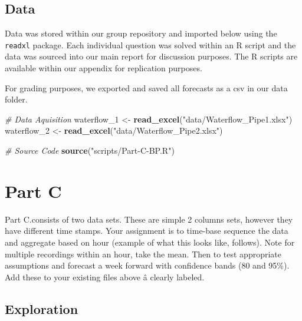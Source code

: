\documentclass[openany]{book}
\newenvironment{Shaded}{\begin{snugshade}}{\end{snugshade}}
\newcommand{\CommentTok}[1]{\textcolor[rgb]{0.56,0.35,0.01}{\textit{#1}}}
\newcommand{\DecValTok}[1]{\textcolor[rgb]{0.00,0.00,0.81}{#1}}
\newcommand{\KeywordTok}[1]{\textcolor[rgb]{0.13,0.29,0.53}{\textbf{#1}}}
\newcommand{\NormalTok}[1]{#1}
\newcommand{\StringTok}[1]{\textcolor[rgb]{0.31,0.60,0.02}{#1}}
\renewenvironment{quote}{\begin{myquote}}{\end{myquote}}
\begin{document}
\newpage

\hypertarget{data}{%
\section*{Data}\label{data}}

Data was stored within our group repository and imported below using the
\texttt{readxl} package. Each individual question was solved within an R
script and the data was sourced into our main report for discussion
purposes. The R scripts are available within our appendix for
replication purposes.

For grading purposes, we exported and saved all forecasts as a csv in
our data folder.

\begin{Shaded}
\begin{Highlighting}[]
\CommentTok{# Data Aquisition}
\NormalTok{waterflow_}\DecValTok{1}\NormalTok{ <-}\StringTok{ }\KeywordTok{read_excel}\NormalTok{(}\StringTok{"data/Waterflow_Pipe1.xlsx"}\NormalTok{)}
\NormalTok{waterflow_}\DecValTok{2}\NormalTok{ <-}\StringTok{ }\KeywordTok{read_excel}\NormalTok{(}\StringTok{"data/Waterflow_Pipe2.xlsx"}\NormalTok{)}

\CommentTok{# Source Code}
\KeywordTok{source}\NormalTok{(}\StringTok{"scripts/Part-C-BP.R"}\NormalTok{)}
\end{Highlighting}
\end{Shaded}

\hypertarget{part-c}{%
\chapter{Part C}\label{part-c}}

\begin{quote}
Part C.consists of two data sets. These are simple 2 columns sets,
however they have different time stamps. Your assignment is to time-base
sequence the data and aggregate based on hour (example of what this
looks like, follows). Note for multiple recordings within an hour, take
the mean. Then to test appropriate assumptions and forecast a week
forward with confidence bands (80 and 95\%). Add these to your existing
files above â clearly labeled.
\end{quote}

\hypertarget{exploration}{%
\section{Exploration}\label{exploration}}
\end{document}
